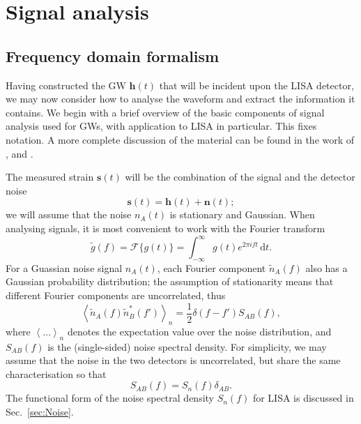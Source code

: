 \documentclass[useAMS,usedcolumn,usegraphicx,usenatbib]{mn2e}
\newcommand{\secref}[1]{Sec.~\ref{sec:#1}}
\newcommand{\dd}{\ensuremath{\mathrm{d}}}
\newcommand{\intd}[4]{\ensuremath{\int_{#1}^{#2}{#3}\,\dd{#4}}}
\newcommand{\recip}[1]{\ensuremath{\frac{1}{#1}}}
\begin{document}
\section{Signal analysis}\label{sec:Signal}

\subsection{Frequency domain formalism}

Having constructed the GW $\boldsymbol{h}(t)$ that will be incident upon the LISA detector, we may now consider how to analyse the waveform and extract the information it contains. We begin with a brief overview of the basic components of signal analysis used for GWs, with application to LISA in particular. This fixes notation. A more complete discussion of the material can be found in the work of \citet{Finn1992}, and \citet{Cutler1994}.

The measured strain $\boldsymbol{s}(t)$ will be the combination of the signal and the detector noise
\begin{equation}
\boldsymbol{s}(t) = \boldsymbol{h}(t) + \boldsymbol{n}(t);
\end{equation}
we will assume that the noise $n_A(t)$ is stationary and Gaussian. When analysing signals, it is most convenient to work with the Fourier transform
\begin{equation}
\tilde{g}(f) = \mathscr{F}\{g(t)\} = \intd{-\infty}{\infty}{g(t)e^{2\pi i ft}}{t}.
\end{equation}
For a Guassian noise signal $n_A(t)$, each Fourier component $\tilde{n}_A(f)$ also has a Gaussian probability distribution; the assumption of stationarity means that different Fourier components are uncorrelated, thus \citep{Cutler1994}
\begin{equation}
\left\langle\tilde{n}_A(f)\tilde{n}_B^*(f')\right\rangle_n = \recip{2}\delta(f - f')S_{AB}(f),
\end{equation}
where $\left\langle\ldots\right\rangle_n$ denotes the expectation value over the noise distribution, and $S_{AB}(f)$ is the (single-sided) noise spectral density. For simplicity, we may assume that the noise in the two detectors is uncorrelated, but share the same characterisation so that \citep{Cutler1998}
\begin{equation}
S_{AB}(f) = S_n(f)\delta_{AB}.
\end{equation}
The functional form of the noise spectral density $S_n(f)$ for LISA is discussed in \secref{Noise}.
\end{document}
